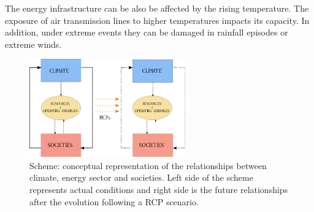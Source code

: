 The energy infrastructure can be also be affected by the rising temperature. The exposure of air transmission lines to higher temperatures impacts its capacity. In addition, under extreme events they can be damaged in rainfall episodes or extreme winds. 


\begin{figure}[h!]
\centering\includegraphics[width=0.6\textwidth]{figs/drawing.pdf}
\caption[Conceptual scheme: climate, energy and societies interactions]{Scheme: conceptual representation of the relationships between climate, energy sector and societies. Left side of the scheme represents actual conditions and right side is the future relationships after the evolution following a RCP scenario. }
\label{fig:feedback}
\end{figure}

 






